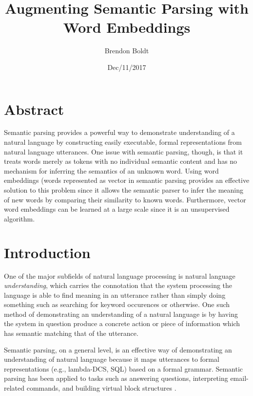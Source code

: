 \documentclass[a4paper]{article}
\title{Augmenting Semantic Parsing with Word Embeddings}
\author{Brendon Boldt}
\date{Dec/11/2017}
\begin{document}





\maketitle


\section*{Abstract}

Semantic parsing provides a powerful way to demonstrate understanding of a
natural language by constructing easily executable, formal
representations from natural language utterances. One issue with semantic parsing, though,
is that it treats words merely as tokens with no individual semantic content
and has no mechanism for inferring
the semantics of an unknown word. Using word embeddings
(words represented as vector
in semantic parsing provides an effective solution to this problem since
it allows the semantic parser to infer the meaning of new words by comparing
their similarity to known words. Furthermore, vector word embeddings can
be learned at a large scale since it is an unsupervised algorithm.

\section{Introduction}

One of the major subfields of natural language processing is natural language
\textit{understanding}, which carries the connotation that the system processing
the language is able to find meaning in an utterance rather than simply
doing something such as searching for keyword occurences or otherwise. %
One such method of demonstrating an understanding of a natural language is
by having the system in question produce a concrete action or piece of
information which has semantic matching that of the utterance.

Semantic parsing, on a general level, is an effective way of demonstrating an
understanding of natural language because it maps utterances to
formal representations (e.g., lambda-DCS, SQL) based on a formal grammar.
Semantic parsing has been applied to tasks such as answering questions,
interpreting email-related commands, and building virtual block structures
\cite{AAAI1612383}
\cite{DBLP:conf/emnlp/BerantCFL13}
\cite{DBLP:journals/corr/WangGLM17}.
\end{document}
